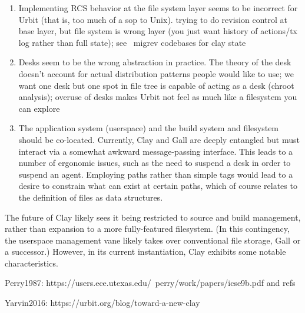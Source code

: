 \documentclass[twoside]{article}
\begin{document}
\begin{enumerate}
  \item  Implementing RCS behavior at the file system layer seems to be incorrect for Urbit (that is, too much of a sop to Unix).  trying to do revision control at base layer, but file system is wrong layer (you just want history of actions/tx log rather than full state); see ~migrev codebases for clay state
  \item  Desks seem to be the wrong abstraction in practice.  The theory of the desk doesn't account for actual distribution patterns people would like to use; we want one desk but one spot in file tree is capable of acting as a desk (chroot analysis); overuse of desks makes Urbit not feel as much like a filesystem you can explore
  \item  The application system (userspace) and the build system and filesystem should be co-located.  Currently, Clay and Gall are deeply entangled but must interact via a somewhat awkward message-passing interface.  This leads to a number of ergonomic issues, such as the need to suspend a desk in order to suspend an agent.  Employing paths rather than simple tags would lead to a desire to constrain what can exist at certain paths, which of course relates to the definition of files as data structures.
\end{enumerate}

The future of Clay likely sees it being restricted to source and build management, rather than expansion to a more fully-featured filesystem.  (In this contingency, the userspace management vane likely takes over conventional file storage, Gall or a successor.)  However, in its current instantiation, Clay exhibits some notable characteristics.

Perry1987:  https://users.ece.utexas.edu/~perry/work/papers/icse9b.pdf
and refs

Yarvin2016: https://urbit.org/blog/toward-a-new-clay


\printbibliography
\end{document}
